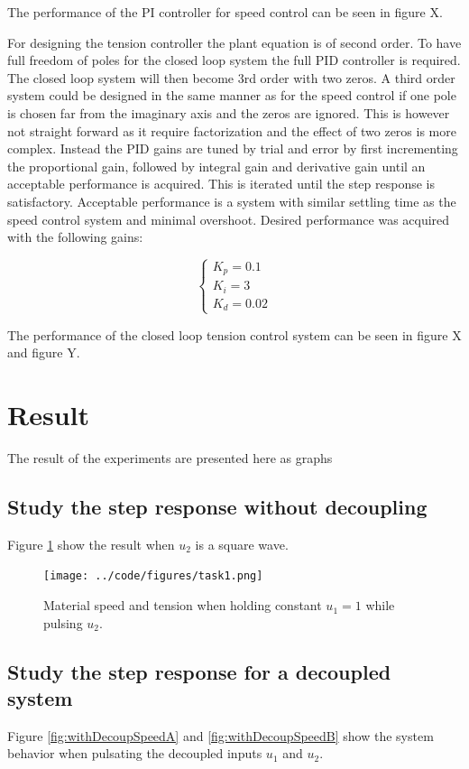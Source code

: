 \documentclass[a4paper, titlepage]{article}
\begin{document}
The performance of the PI controller for speed control can be seen in figure X.

For designing the tension controller the plant equation is of second order.
To have full freedom of poles for the closed loop system the full PID controller is required.
The closed loop system will then become 3rd order with two zeros.
A third order system could be designed in the same manner as for the speed control if one pole is chosen far from the imaginary axis and the zeros are ignored.
This is however not straight forward as it require factorization and the effect of two zeros is more complex.
Instead the PID gains are tuned by trial and error by first incrementing the proportional gain, followed by integral gain and derivative gain until an acceptable performance is acquired.
This is iterated until the step response is satisfactory.
Acceptable performance is a system with similar settling time as the speed control system and minimal overshoot.
Desired performance was acquired with the following gains:

\begin{equation}
\begin{cases}
K_p = 0.1 \\ K_i = 3 \\ K_d = 0.02
\end{cases}
\end{equation}

The performance of the closed loop tension control system can be seen in figure X and figure Y.


\section{Result}
The result of the experiments are presented here as graphs
\subsection{Study the step response without decoupling}
Figure \ref{fig:withoutDecoup} show the result when $u_2$ is a square wave. 

\begin{figure}[H]
\center
\texttt{[image: ../code/figures/task1.png]}
\caption{Material speed and tension when holding constant $u_1 = 1$ while pulsing $u_2$.}
\label{fig:withoutDecoup}
\end{figure}


\subsection{Study the step response for a decoupled system}
Figure \ref{fig:withDecoupSpeedA} and \ref{fig:withDecoupSpeedB} show the system behavior when pulsating the decoupled inputs $u_1$ and $u_2$.
\end{document}
